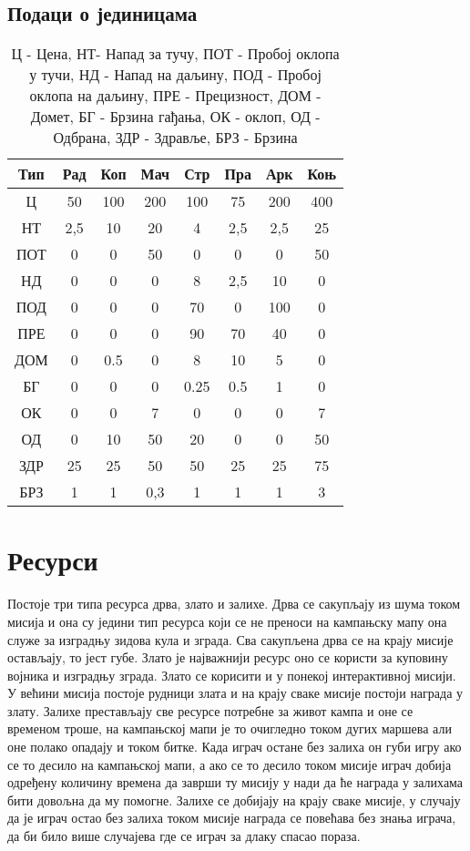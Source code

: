 \documentclass[11pt,a4paper]{report}
\begin{document}
\begin{table}[h]
\subsection{Подаци о јединицама}
\centering
\begin{tabular}{|| c || c | c | c | c | c | c | c ||}
\hline
Тип & Рад & Коп & Мач & Стр & Пра & Арк & Коњ \\
\hline\hline
Ц & 50 & 100 & 200 & 100 & 75 & 200 & 400\\
\hline
НТ & 2,5 & 10 & 20 & 4 & 2,5 & 2,5 & 25\\
\hline
ПОТ & 0 & 0 & 50 & 0 & 0 & 0 & 50\\
\hline
НД & 0 & 0 & 0 & 8 & 2,5 & 10 & 0\\
\hline
ПОД & 0 & 0 & 0 & 70 & 0 & 100 & 0\\
\hline
ПРЕ & 0 & 0 & 0 & 90 & 70 & 40 & 0\\
\hline
ДОМ & 0 & 0.5 & 0 & 8 & 10 & 5 & 0\\
\hline
БГ & 0 & 0 & 0 & 0.25 & 0.5 & 1 & 0\\
\hline
ОК & 0 & 0 & 7 & 0 & 0 & 0 & 7\\
\hline
ОД & 0 & 10 & 50 & 20 & 0 & 0 & 50\\
\hline
ЗДР & 25 & 25 & 50 & 50 & 25 & 25 & 75\\
\hline
БРЗ & 1 & 1 & 0,3 & 1 & 1 & 1 & 3 \\
\hline

\end{tabular}
\caption{Ц - Цена, НТ- Напад за тучу, ПОТ - Пробој оклопа у тучи, НД - Напад на даљину, ПОД - Пробој оклопа на даљину, ПРЕ - Прецизност, ДОМ - Домет, БГ - Брзина гађања, ОК - оклоп, ОД - Одбрана, ЗДР - Здравље, БРЗ - Брзина }
\end{table}
\FloatBarrier

\section{Ресурси}
Постоје три типа ресурса дрва, злато и залихе. Дрва се сакупљају из шума током мисија и она су једини тип ресурса који се не преноси на кампањску мапу она служе за изградњу зидова кула и зграда. Сва сакупљена дрва се на крају мисије остављају, то јест губе. Злато је најважнији ресурс оно се користи за куповину војника и изградњу зграда. Злато се корисити и у понекој интерактивној мисији. У већини мисија постоје рудници злата и на крају сваке мисије постоји награда у злату. Залихе престављају све ресурсе потребне за живот кампа и оне се временом троше, на кампањској мапи је то очигледно током дугих маршева али оне полако опадају и током битке. Када играч остане без залиха он губи игру ако се то десило на кампањској мапи, а ако се то десило током мисије играч добија одређену количину времена да заврши ту мисију у нади да ће награда у залихама бити довољна да му помогне. Залихе се добијају на крају сваке мисије, у случају да је играч остао без залиха током мисије награда се повећава без знања играча, да би било више случајева где се играч за длаку спасао пораза.
\end{document}
